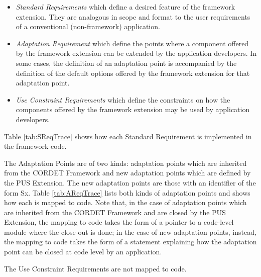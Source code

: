 \documentclass{pnp_article}
\begin{document}
\begin{itemize}
\item{} \textit{Standard Requirements} which define a desired feature of the framework extension. They are analogous in scope and format to the user requirements of a conventional (non-framework) application.
\item{} \textit{Adaptation Requirement} which define the points where a component offered by the framework extension can be extended by the application developers. In some cases, the definition of an adaptation point is accompanied by the definition of the default options offered by the framework extension for that adaptation point.  
\item{} \textit{Use Constraint Requirements} which define the constraints on how the components offered by the framework extension may be used by application developers.
\end{itemize}

Table \ref{tab:SReqTrace} shows how each Standard Requirement is implemented in the framework code. 

The Adaptation Points are of two kinds: adaptation points which are inherited from the CORDET Framework and new adaptation points which are defined by the PUS Extension. The new adaptation points are those with an identifier of the form Sx. Table \ref{tab:AReqTrace} lists both kinds of adaptation points and shows how each is mapped to code. Note that, in the case of adaptation points which are inherited from the CORDET Framework and are closed by the PUS Extension, the mapping to code takes the form of a pointer to a code-level module where the close-out is done; in the case of new adaptation points, instead, the mapping to code takes the form of a statement explaining how the adaptation point can be closed at code level by an application.

The Use Constraint Requirements are not mapped to code. 


\begin{landscape}

\newpage
{}


\end{landscape}
\end{document}
